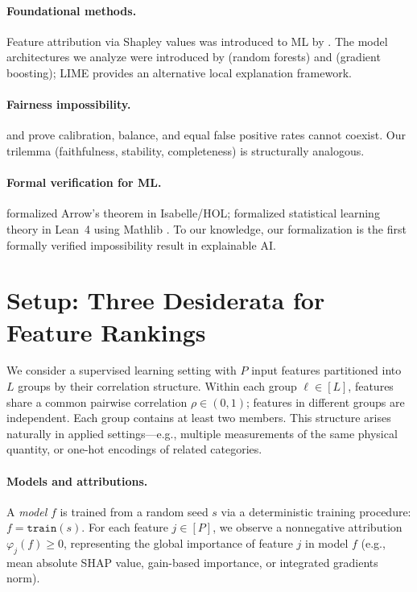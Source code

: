 \documentclass{jmlr}
\begin{document}
\paragraph{Foundational methods.}
Feature attribution via Shapley values \citep{shapley1953value} was introduced to ML by \citet{lundberg2017unified}.
The model architectures we analyze were introduced by \citet{breiman2001random} (random forests) and \citet{friedman2001greedy} (gradient boosting); LIME \citep{ribeiro2016should} provides an alternative local explanation framework.

\paragraph{Fairness impossibility.}
\citet{chouldechova2017fair} and \citet{kleinberg2017inherent} prove calibration, balance, and equal false positive rates cannot coexist.
Our trilemma (faithfulness, stability, completeness) is structurally analogous.

\paragraph{Formal verification for ML.}
\citet{nipkow2009social} formalized Arrow's theorem in Isabelle/HOL; \citet{zhang2026statistical} formalized statistical learning theory in Lean~4 \citep{demoura2021lean4} using Mathlib \citep{mathlib2020}. To our knowledge, our formalization is the first formally verified impossibility result in explainable AI.


\section{Setup: Three Desiderata for Feature Rankings}
\label{sec:setup}

We consider a supervised learning setting with $P$ input features partitioned into $L$ groups by their correlation structure.
Within each group $\ell \in [L]$, features share a common pairwise correlation $\rho \in (0,1)$; features in different groups are independent.
Each group contains at least two members.
This structure arises naturally in applied settings---e.g., multiple measurements of the same physical quantity, or one-hot encodings of related categories.

\paragraph{Models and attributions.}
A \emph{model} $f$ is trained from a random seed $s$ via a deterministic training procedure: $f = \texttt{train}(s)$.
For each feature $j \in [P]$, we observe a nonneg\-ative attribution $\varphi_j(f) \geq 0$, representing the global importance of feature $j$ in model $f$ (e.g., mean absolute SHAP value, gain-based importance, or integrated gradients norm).
\end{document}
